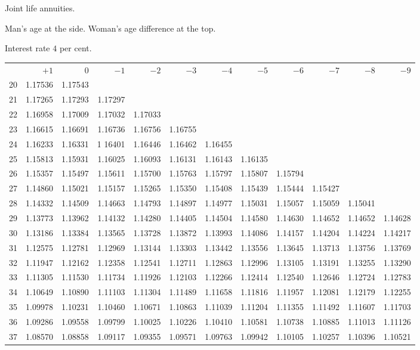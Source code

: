 \clearpage
{}
\begin{center}
Joint life annuities.\par\smallskip
Man's age at the side. Woman's age difference at the top.\par\smallskip
Interest rate \(4\) per cent.\par\medskip
\fontsize{8}{10}\selectfont\setlength{\tabcolsep}{1.3pt}
\begin{tabular}{|r|rrrrrrrrrrr|}
\hline
&\(+1\)&0&\(-1\)&\(-2\)&\(-3\)&\(-4\)&\(-5\)&\(-6\)&\(-7\)&\(-8\)&\(-9\)\\[8pt]
20&1.17536&1.17543&&&&&&&&&\\
21&1.17265&1.17293&1.17297&&&&&&&&\\
22&1.16958&1.17009&1.17032&1.17033&&&&&&&\\
23&1.16615&1.16691&1.16736&1.16756&1.16755&&&&&&\\
24&1.16233&1.16331&1 16401&1.16446&1.16462&1.16455&&&&&\\[5pt]
25&1.15813&1.15931&1.16025&1.16093&1.16131&1.16143&1.16135&&&&\\
26&1.15357&1.15497&1.15611&1.15700&1.15763&1.15797&1.15807&1.15794&&&\\
27&1.14860&1.15021&1.15157&1.15265&1.15350&1.15408&1.15439&1.15444&1.15427&&\\
28&1.14332&1.14509&1.14663&1.14793&1.14897&1.14977&1.15031&1.15057&1.15059&1.15041&\\
29&1.13773&1.13962&1.14132&1.14280&1.14405&1.14504&1.14580&1.14630&1.14652&1.14652&1.14628\\[5pt]
30&1.13186&1.13384&1.13565&1.13728&1.13872&1.13993&1.14086&1.14157&1.14204&1.14224&1.14217\\
31&1.12575&1.12781&1.12969&1.13144&1.13303&1.13442&1.13556&1.13645&1.13713&1.13756&1.13769\\
32&1.11947&1.12162&1.12358&1.12541&1.12711&1.12863&1.12996&1.13105&1.13191&1.13255&1.13290\\
33&1.11305&1.11530&1.11734&1.11926&1.12103&1.12266&1.12414&1.12540&1.12646&1.12724&1.12783\\
34&1.10649&1.10890&1.11103&1.11304&1.11489&1.11658&1.11816&1.11957&1.12081&1.12179&1.12255\\[5pt]
35&1.09978&1.10231&1.10460&1.10671&1.10863&1.11039&1.11204&1.11355&1.11492&1.11607&1.11703\\
36&1.09286&1.09558&1.09799&1.10025&1.10226&1.10410&1.10581&1.10738&1.10885&1.11013&1.11126\\
37&1.08570&1.08858&1.09117&1.09355&1.09571&1.09763&1.09942&1.10105&1.10257&1.10396&1.10521\\

\end{tabular}
\end{center}
